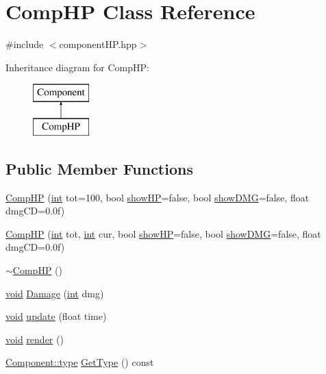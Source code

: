 \hypertarget{class_comp_h_p}{\section{Comp\-H\-P Class Reference}
\label{class_comp_h_p}
}


{\ttfamily \#include $<$component\-H\-P.\-hpp$>$}

Inheritance diagram for Comp\-H\-P\-:\begin{figure}[H]
\begin{center}
\leavevmode
\includegraphics[height=2.000000cm]{class_comp_h_p}
\end{center}
\end{figure}
\subsection*{Public Member Functions}
\begin{DoxyCompactItemize}
\item 
\hyperlink{class_comp_h_p_aeb0ef6fb592a3fb40777f1cc4b9603fb}{Comp\-H\-P} (\hyperlink{_s_d_l__thread_8h_a6a64f9be4433e4de6e2f2f548cf3c08e}{int} tot=100, bool \hyperlink{class_comp_h_p_a19b9aed1c306f6d4f083343a346245bd}{show\-H\-P}=false, bool \hyperlink{class_comp_h_p_a91b1dfaf9488d5402e4a6db7384f0732}{show\-D\-M\-G}=false, float dmg\-C\-D=0.\-0f)
\item 
\hyperlink{class_comp_h_p_a56cd5967f1e9249800ec4ba1503b7bb4}{Comp\-H\-P} (\hyperlink{_s_d_l__thread_8h_a6a64f9be4433e4de6e2f2f548cf3c08e}{int} tot, \hyperlink{_s_d_l__thread_8h_a6a64f9be4433e4de6e2f2f548cf3c08e}{int} cur, bool \hyperlink{class_comp_h_p_a19b9aed1c306f6d4f083343a346245bd}{show\-H\-P}=false, bool \hyperlink{class_comp_h_p_a91b1dfaf9488d5402e4a6db7384f0732}{show\-D\-M\-G}=false, float dmg\-C\-D=0.\-0f)
\item 
\hyperlink{class_comp_h_p_a5d90002f92e3fbdbb37dc16b468165ea}{$\sim$\-Comp\-H\-P} ()
\item 
\hyperlink{_s_d_l__opengles2__gl2ext_8h_ae5d8fa23ad07c48bb609509eae494c95}{void} \hyperlink{class_comp_h_p_a7c3a36ab0d8b75c24517e16600057dda}{Damage} (\hyperlink{_s_d_l__thread_8h_a6a64f9be4433e4de6e2f2f548cf3c08e}{int} dmg)
\item 
\hyperlink{_s_d_l__opengles2__gl2ext_8h_ae5d8fa23ad07c48bb609509eae494c95}{void} \hyperlink{class_comp_h_p_addbc7227df2932a60af577a1da7ff7a5}{update} (float time)
\item 
\hyperlink{_s_d_l__opengles2__gl2ext_8h_ae5d8fa23ad07c48bb609509eae494c95}{void} \hyperlink{class_comp_h_p_a81565c18ea23d7e67cfeccecad45fdd9}{render} ()
\item 
\hyperlink{class_component_ad6d161b6acf7b843b55bb9feac7af71a}{Component\-::type} \hyperlink{class_comp_h_p_a0fd0311386f7029e9b5cc49742fce649}{Get\-Type} () const 
\end{DoxyCompactItemize}
